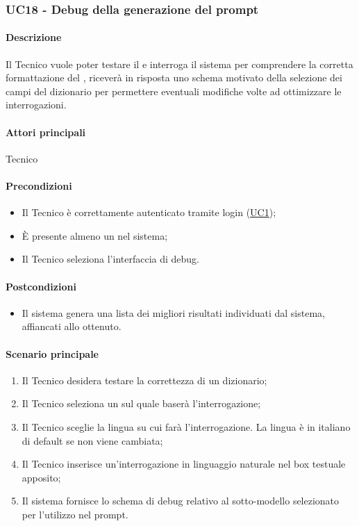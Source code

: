 \subsubsection{UC18 - Debug della generazione del prompt}\label{UC18}

\paragraph*{Descrizione}
Il Tecnico vuole poter testare il  e interroga il sistema per comprendere la corretta formattazione del , riceverà in risposta uno schema motivato della selezione dei campi del dizionario per permettere eventuali modifiche volte ad ottimizzare le interrogazioni.

\paragraph*{Attori principali}
Tecnico

\paragraph*{Precondizioni}
\begin{itemize}
  \item Il Tecnico è correttamente autenticato tramite login (\hyperref[UC1]{UC1});
  \item È presente almeno un  nel sistema;
  \item Il Tecnico seleziona l’interfaccia di debug.
\end{itemize}

\paragraph*{Postcondizioni}
\begin{itemize}
  \item Il sistema genera una lista dei migliori risultati individuati dal sistema, affiancati allo  ottenuto.
\end{itemize}

\paragraph*{Scenario principale}
\begin{enumerate}
  \item Il Tecnico desidera testare la correttezza di un dizionario; 
  \item Il Tecnico seleziona un  sul quale baserà l’interrogazione;
  \item Il Tecnico sceglie la lingua su cui farà l’interrogazione. La lingua è in italiano di default se non viene cambiata;
  \item Il Tecnico inserisce un’interrogazione in linguaggio naturale nel box testuale apposito;
  \item Il sistema fornisce lo schema di debug relativo al sotto-modello selezionato per l’utilizzo nel prompt.  
\end{enumerate}

